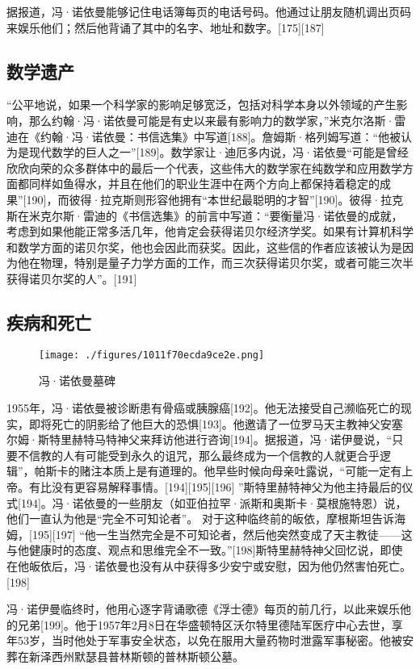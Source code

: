 据报道，冯·诺依曼能够记住电话簿每页的电话号码。他通过让朋友随机调出页码来娱乐他们；然后他背诵了其中的名字、地址和数字。[175][187]

\subsection{数学遗产}
“公平地说，如果一个科学家的影响足够宽泛，包括对科学本身以外领域的产生影响，那么约翰·冯·诺依曼可能是有史以来最有影响力的数学家，”米克尔洛斯·雷迪在《约翰·冯·诺依曼：书信选集》中写道[188]。詹姆斯·格列姆写道：“他被认为是现代数学的巨人之一”[189]。数学家让·迪厄多内说，冯·诺依曼“可能是曾经欣欣向荣的众多群体中的最后一个代表，这些伟大的数学家在纯数学和应用数学方面都同样如鱼得水，并且在他们的职业生涯中在两个方向上都保持着稳定的成果”[190]，而彼得·拉克斯则形容他拥有“本世纪最聪明的才智”[190]。彼得·拉克斯在米克尔斯·雷迪的《书信选集》的前言中写道：“要衡量冯·诺依曼的成就，考虑到如果他能正常多活几年，他肯定会获得诺贝尔经济学奖。如果有计算机科学和数学方面的诺贝尔奖，他也会因此而获奖。因此，这些信的作者应该被认为是因为他在物理，特别是量子力学方面的工作，而三次获得诺贝尔奖，或者可能三次半获得诺贝尔奖的人”。[191]

\subsection{疾病和死亡}
\begin{figure}[ht]
\centering
\texttt{[image: ./figures/1011f70ecda9ce2e.png]}
\caption{冯·诺依曼墓碑} \label{fig_von_11}
\end{figure}
1955年，冯·诺依曼被诊断患有骨癌或胰腺癌[192]。他无法接受自己濒临死亡的现实，即将死亡的阴影给了他巨大的恐惧[193]。他邀请了一位罗马天主教神父安塞尔姆·斯特里赫特马特神父来拜访他进行咨询[194]。据报道，冯·诺伊曼说，“只要不信教的人有可能受到永久的诅咒，那么最终成为一个信教的人就更合乎逻辑”，帕斯卡的赌注本质上是有道理的。他早些时候向母亲吐露说，“可能一定有上帝。有比没有更容易解释事情。[194][195][196] ”斯特里赫特神父为他主持最后的仪式[194]。冯·诺依曼的一些朋友（如亚伯拉罕·派斯和奥斯卡·莫根施特恩）说，他们一直认为他是“完全不可知论者”。 对于这种临终前的皈依，摩根斯坦告诉海姆，[195][197] “他一生当然完全是不可知论者，然后他突然变成了天主教徒——这与他健康时的态度、观点和思维完全不一致。”[198]斯特里赫特神父回忆说，即使在他皈依后，冯·诺依曼也没有从中获得多少安宁或安慰，因为他仍然害怕死亡。[198]

冯·诺伊曼临终时，他用心逐字背诵歌德《浮士德》每页的前几行，以此来娱乐他的兄弟[199]。他于1957年2月8日在华盛顿特区沃尔特里德陆军医疗中心去世，享年53岁，当时他处于军事安全状态，以免在服用大量药物时泄露军事秘密。他被安葬在新泽西州默瑟县普林斯顿的普林斯顿公墓。

